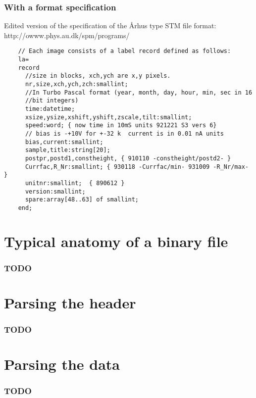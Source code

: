 \documentclass{beamer}
\begin{document}
\begin{frame}[fragile]
  \frametitle{With a format specification}
  Edited version of the specification of the \AA{}rhus type STM file format: http://owww.phys.au.dk/spm/programs/
  \footnotesize
  \begin{verbatim}
    // Each image consists of a label record defined as follows:
    la=
    record
      //size in blocks, xch,ych are x,y pixels.
      nr,size,xch,ych,zch:smallint;
      //In Turbo Pascal format (year, month, day, hour, min, sec in 16
      //bit integers)
      time:datetime;
      xsize,ysize,xshift,yshift,zscale,tilt:smallint;
      speed:word; { now time in 10mS units 921221 S3 vers 6}
      // bias is -+10V for +-32 k  current is in 0.01 nA units
      bias,current:smallint;
      sample,title:string[20];
      postpr,postd1,constheight, { 910110 -constheight/postd2- }
      Currfac,R_Nr:smallint; { 930118 -Currfac/min- 931009 -R_Nr/max- }
      unitnr:smallint;  { 890612 }
      version:smallint;
      spare:array[48..63] of smallint;
    end;
  \end{verbatim}
\end{frame}

\section{Typical anatomy of a binary file}
\begin{frame}
  \frametitle{TODO}
\end{frame}

\section{Parsing the header}
\begin{frame}
  \frametitle{TODO}
\end{frame}

\section{Parsing the data}
\begin{frame}
  \frametitle{TODO}
\end{frame}

% 
\end{document}
